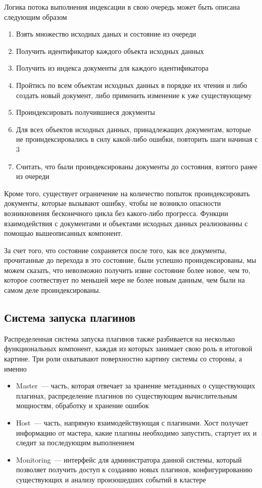 Логика потока выполнения индексации в свою очередь может быть описана следующим образом

\begin{enumerate}
	\item Взять множество исходных даных и состояние из очереди
	\item Получить идентификатор каждого объекта исходных данных
	\item Получить из индекса документы для каждого идентификатора
	\item Пройтись по всем объектам исходных данных в порядке их чтения и либо создать новый документ, либо применить изменение к уже существующему
	\item Проиндексировать получившиеся документы
	\item Для всех объектов исходных данных, принадлежащих документам, которые не проиндексировались в силу какой-либо ошибки, повторить шаги начиная с 3
	\item Считать, что были проиндексированы документы до состояния, взятого ранее из очереди
\end{enumerate}

Кроме того, существует ограничение на количество попыток проиндексировать документы, которые вызывают ошибку, чтобы не возникло опасности возникновения бесконечного цикла без какого-либо прогресса. Функции взаимодействия с документами и объектами исходных данных реализованны с помощью вышеописанных компонент.

За счет того, что состояние сохраняется после того, как все документы, прочитанные до перехода в это состояние, были успешно проиндексированы, мы можем сказать, что невозможно получить извне состояние более новое, чем то, которое соотвествует по меньшей мере не более новым данным, чем были на самом деле проиндексированы.

\subsection{Система запуска плагинов}

Распределенная система запуска плагинов также разбивается на несколько функциональных компонент, каждая из которых занимает свою роль в итоговой картине. Три роли охватывают поверхностно картину системы со стороны, а именно

\begin{itemize}
	\item Master~--- часть, которая отвечает за хранение метаданных о существующих плагинах, распределение плагинов по существующим вычислительным мощностям, обработку и хранение ошибок
	\item Host~--- часть, напрямую взаимодействующая с плагинами. Хост получает информацию от мастера, какие плагины необходимо запустить, стартует их и следит за последующим выполнением
	\item Monitoring~--- интерфейс для администратора данной системы, который позволяет получить доступ к созданию новых плагинов, конфигурированию существующих и анализу произошедших событий в кластере
\end{itemize}

